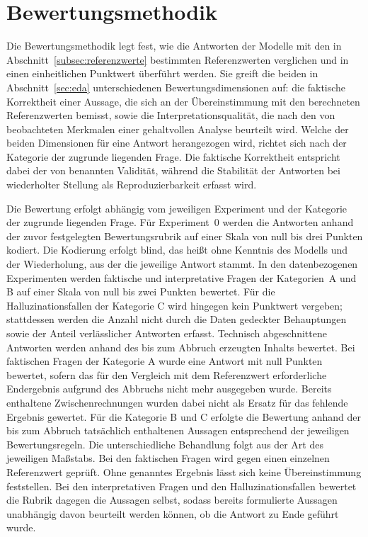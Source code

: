 \section*{Bewertungsmethodik} 
\label{sec:evaluation}

Die Bewertungsmethodik legt fest, wie die Antworten der Modelle mit den in Abschnitt~\ref{subsec:referenzwerte} bestimmten Referenzwerten verglichen und in einen einheitlichen Punktwert überführt werden. Sie greift die beiden in Abschnitt~\ref{sec:eda} unterschiedenen Bewertungsdimensionen auf: die faktische Korrektheit einer Aussage, die sich an der Übereinstimmung mit den berechneten Referenzwerten bemisst, sowie die Interpretationsqualität, die nach den von \textcite{koesten_talking_2021} beobachteten Merkmalen einer gehaltvollen Analyse beurteilt wird. Welche der beiden Dimensionen für eine Antwort herangezogen wird, richtet sich nach der Kategorie der zugrunde liegenden Frage. Die faktische Korrektheit entspricht dabei der von \textcite{bornschlegl_towards_2024} benannten Validität, während die Stabilität der Antworten bei wiederholter Stellung als Reproduzierbarkeit erfasst wird.

Die Bewertung erfolgt abhängig vom jeweiligen Experiment und der Kategorie der zugrunde liegenden Frage. Für Experiment~0 werden die Antworten anhand der zuvor festgelegten Bewertungsrubrik auf einer Skala von null bis drei Punkten kodiert. Die Kodierung erfolgt blind, das heißt ohne Kenntnis des Modells und der Wiederholung, aus der die jeweilige Antwort stammt. In den datenbezogenen Experimenten werden faktische und interpretative Fragen der Kategorien~A und B auf einer Skala von null bis zwei Punkten bewertet. Für die Halluzinationsfallen der Kategorie C wird hingegen kein Punktwert vergeben; stattdessen werden die Anzahl nicht durch die Daten gedeckter Behauptungen sowie der Anteil verlässlicher Antworten erfasst. Technisch abgeschnittene Antworten werden anhand des bis zum Abbruch erzeugten Inhalts bewertet. Bei faktischen Fragen der Kategorie A wurde eine Antwort mit null Punkten bewertet, sofern das für den Vergleich mit dem Referenzwert erforderliche Endergebnis aufgrund des Abbruchs nicht mehr ausgegeben wurde. Bereits enthaltene Zwischenrechnungen wurden dabei nicht als Ersatz für das fehlende Ergebnis gewertet. Für die Kategorie B und C erfolgte die Bewertung anhand der bis zum Abbruch tatsächlich enthaltenen Aussagen entsprechend der jeweiligen Bewertungsregeln. Die unterschiedliche Behandlung folgt aus der Art des jeweiligen Maßstabs. Bei den faktischen Fragen wird gegen einen einzelnen Referenzwert geprüft. Ohne genanntes Ergebnis lässt sich keine Übereinstimmung feststellen. Bei den interpretativen Fragen und den Halluzinationsfallen bewertet die Rubrik dagegen die Aussagen selbst, sodass bereits formulierte Aussagen unabhängig davon beurteilt werden können, ob die Antwort zu Ende geführt wurde.


